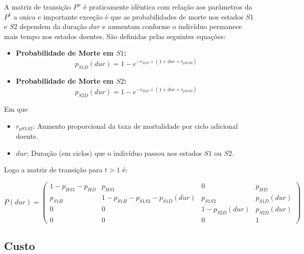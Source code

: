 \documentclass[12pt, a4paper, openany]{book}
\numberwithin{equation}{chapter}
\numberwithin{table}{chapter}
\numberwithin{figure}{chapter}
\theoremstyle{break}
\begin{document}





A matriz de transição $P^{n}$ é praticamente idêntica com relação aos parâmetros da $P^{1}$ a onica e importante exceção é que as probabilidades de morte nos estados \( S1 \) e \( S2 \) dependem da duração \( dur \) e aumentam conforme o indivíduo permanece mais tempo nos estados doentes. São definidas pelas seguintes equações:



\begin{itemize}
    \item \textbf{Probabilidade de Morte em \( S1 \):}
    \[
    p_{S1D}(dur) = 1 - e^{-r_{S1D} \times (1 + dur \times r_{pS1S2})}
    \]
    \item \textbf{Probabilidade de Morte em \( S2 \):}
    \[
    p_{S2D}(dur) = 1 - e^{-r_{S2D} \times (1 + dur \times r_{pS1S2})}
    \]
\end{itemize}

Em que
\begin{itemize}
    \item \( r_{pS1S2} \): Aumento proporcional da taxa de mortalidade por ciclo adicional doente.
    \item \( dur \): Duração (em ciclos) que o indivíduo passou nos estados \( S1 \) ou \( S2 \).
\end{itemize}


Logo a matriz de transição para $t>1$ é: 

\[
P(dur) =
\begin{pmatrix}
1 - p_{HS1} - p_{HD} & p_{HS1} & 0 & p_{HD} \\
p_{S1H} & 1 - p_{S1H} - p_{S1S2} - p_{S1D}(dur) & p_{S1S2} & p_{S1D}(dur) \\
0 & 0 & 1 - p_{S2D}(dur) & p_{S2D}(dur) \\
0 & 0 & 0 & 1
\end{pmatrix}
\]










\subsection{Custo}
\end{document}
